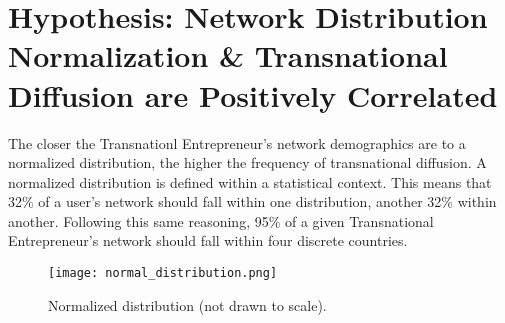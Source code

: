 \section{Hypothesis: Network Distribution Normalization \& Transnational Diffusion are Positively Correlated}
The closer the Transnationl Entrepreneur's network demographics are to
a normalized distribution, the higher the frequency of transnational
diffusion. A normalized distribution is defined within a statistical
context. This means that 32\% of a user's network should fall within
one distribution, another 32\% within another. Following this same
reasoning, 95\% of a given Transnational Entrepreneur's network should
fall within four discrete countries.
\begin{figure}[!ht]
  \centering
  \texttt{[image: normal\_distribution.png]}
  \caption{Normalized distribution (not drawn to scale).}
\end{figure}
